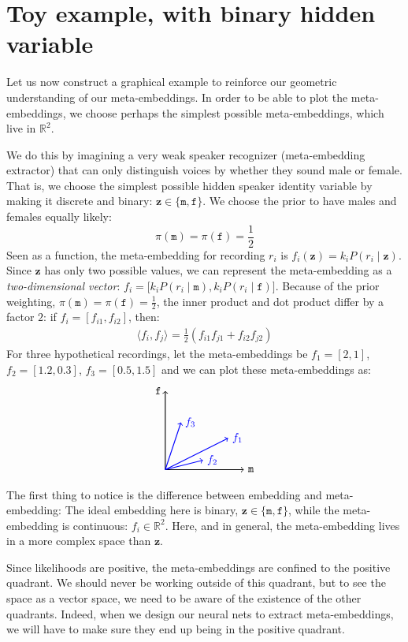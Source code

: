\documentclass[a4paper,oneside,12pt,english]{report}
\def\zvec{\mathbf{z}}
\def\expv#1#2{\bigl\langle#1\bigr\rangle_{#2}}
\def\R{\mathbb{R}}
\def\dot#1#2{\expv{#1,#2}{}}
\begin{document}
\section{Toy example, with binary hidden variable}
\label{sec:exem}
\def\male{\texttt{m}}
\def\female{\texttt{f}}
Let us now construct a graphical example to reinforce our geometric understanding of our meta-embeddings. In order to be able to plot the meta-embeddings, we choose perhaps the simplest possible meta-embeddings, which live in $\R^2$. 

We do this by imagining a very weak speaker recognizer (meta-embedding extractor) that can only distinguish voices by whether they sound male or female. That is, we choose the simplest possible hidden speaker identity variable by making it discrete and binary: $\zvec\in\{\male,\female\}$. We choose the prior to have males and females equally likely:  
$$\pi(\male)=\pi(\female)=\frac12$$ 
Seen as a function, the meta-embedding for recording $r_i$ is $f_i(\zvec) = k_i P(r_i\mid\zvec)$. Since $\zvec$ has only two possible values, we can represent the meta-embedding as a \emph{two-dimensional vector}: $f_i = \bigl[k_iP(r_i\mid\male),k_iP(r_i\mid\female)\bigr]$. Because of the prior weighting, $\pi(\male)=\pi(\female)=\frac12$, the inner product and dot product differ by a factor $2$: if $f_i=[f_{i1},f_{i2}]$, then:
\begin{align}
\dot{f_i}{f_j} = \frac12(f_{i1}f_{j1} + f_{i2}f_{j2})
\end{align}
For three hypothetical recordings, let the meta-embeddings be $f_1=[2,1]$, $f_2=[1.2,0.3]$, $f_3=[0.5,1.5]$ and we can plot these meta-embeddings as:
$$
\begin{tikzpicture}[xscale=1,yscale=1,thick]

\draw[->] (0,0) -- (0,2.5) node[left]{$\female$};
\draw[->] (0,0) -- (2.5,0) node[right]{$\male$};

\draw[->,blue] (0,0) -- (2,1) node[right]{$f_1$};
\draw[->,blue] (0,0) -- (1.2,0.3) node[right]{$f_2$};
\draw[->,blue] (0,0) -- (0.5,1.5) node[right]{$f_3$};
\end{tikzpicture}
$$
The first thing to notice is the difference between embedding and meta-embedding: The ideal embedding here is binary, $\zvec\in\{\male,\female\}$, while the meta-embedding is continuous: $f_i\in\R^2$. Here, and in general, the meta-embedding lives in a more complex space than $\zvec$. 

Since likelihoods are positive, the meta-embeddings are confined to the positive quadrant. We should never be working outside of this quadrant, but to see the space as a vector space, we need to be aware of the existence of the other quadrants. Indeed, when we design our neural nets to extract meta-embeddings, we will have to make sure they end up being in the positive quadrant. 
\end{document}
